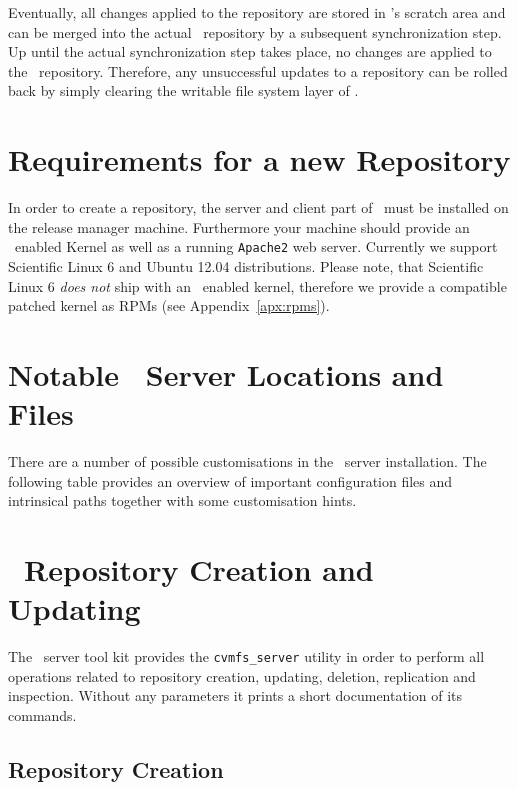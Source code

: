 Eventually, all changes applied to the repository are stored in \aufs's scratch area and can be merged into the actual \cvmfs\ repository by a subsequent synchronization step.
Up until the actual synchronization step takes place, no changes are applied to the \cvmfs\ repository.
Therefore, any unsuccessful updates to a repository can be rolled back by simply clearing the writable file system layer of \aufs.

\section{Requirements for a new Repository}
\label{sct:newreporequirements}

In order to create a repository, the server and client part of \cvmfs\ must be installed on the release manager machine.
Furthermore your machine should provide an \aufs\ enabled Kernel as well as a running \texttt{Apache2} web server.
Currently we support Scientific Linux 6 and Ubuntu 12.04 distributions.
Please note, that Scientific Linux 6 \emph{does not} ship with an \aufs\ enabled kernel, therefore we provide a compatible patched kernel as RPMs (see Appendix~\ref{apx:rpms}).


\pagebreak
\section{Notable \cvmfs\ Server Locations and Files}
\label{sct:repoanatomy}
There are a number of possible customisations in the \cvmfs\ server installation.
The following table provides an overview of important configuration files and intrinsical paths together with some customisation hints.


\section{\cvmfs\ Repository Creation and Updating}
\label{sct:repocreateandupdate}
The \cvmfs\ server tool kit provides the \texttt{cvmfs\_server} utility in order to perform all operations related to repository creation, updating, deletion, replication and inspection.
Without any parameters it prints a short documentation of its commands.

\subsection{Repository Creation}
\label{sct:repocreation}

